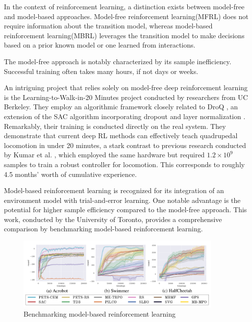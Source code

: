 In the context of reinforcement learning, a distinction exists between model-free and model-based approaches. Model-free reinforcement learning(MFRL) does not require information about the transition model, whereas model-based reinforcement learning(MBRL) leverages the transition model to make decisions based on a prior known model or one learned from interactions.

The model-free approach is notably characterized by its sample inefficiency. Successful training often takes many hours, if not days or weeks.

An intriguing project that relies solely on model-free deep reinforcement learning is the Learning-to-Walk-in-20 Minutes project\cite{smith2022walk} conducted by researchers from UC Berkeley. They employ an algorithmic framework closely related to DroQ \cite{hiraoka2021dropout}, an extension of the SAC algorithm \cite{haarnoja2018soft} incorporating dropout \cite{srivastava2014dropout} and layer normalization \cite{ba2016layer}. Remarkably, their training is conducted directly on the real system. They demonstrate that current deep RL methods can effectively teach quadrupedal locomotion in under 20 minutes, a stark contrast to previous research conducted by Kumar et al. \cite{kumar2021rma}, which employed the same hardware but required \(1.2 \times 10^9\) samples to train a robust controller for locomotion. This corresponds to roughly 4.5 months' worth of cumulative experience.

Model-based reinforcement learning is recognized for its integration of an environment model with trial-and-error learning. One notable advantage is the potential for higher sample efficiency compared to the model-free approach. This work, conducted by the University of Toronto\cite{wang2019benchmarking}, provides a comprehensive comparison by benchmarking model-based reinforcement learning.

\begin{figure}[H]
  \centering
  \includegraphics[width=0.9\textwidth]{figures/benchmarking_mbrl.png} %
  \caption{Benchmarking model-based reinforcement learning\cite{wang2019benchmarking}}
  \label{fig:benchmarking MBRL}
\end{figure}

